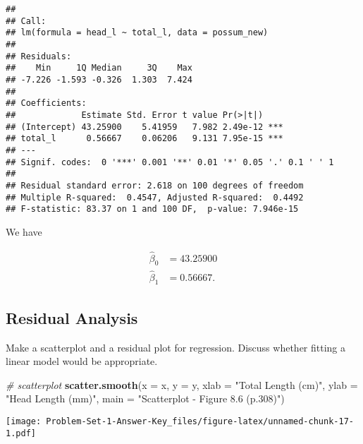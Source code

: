 \documentclass[
]{book}
\newenvironment{Shaded}{\begin{snugshade}}{\end{snugshade}}
\newcommand{\CommentTok}[1]{\textcolor[rgb]{0.56,0.35,0.01}{\textit{#1}}}
\newcommand{\DataTypeTok}[1]{\textcolor[rgb]{0.13,0.29,0.53}{#1}}
\newcommand{\DecValTok}[1]{\textcolor[rgb]{0.00,0.00,0.81}{#1}}
\newcommand{\KeywordTok}[1]{\textcolor[rgb]{0.13,0.29,0.53}{\textbf{#1}}}
\newcommand{\NormalTok}[1]{#1}
\newcommand{\OperatorTok}[1]{\textcolor[rgb]{0.81,0.36,0.00}{\textbf{#1}}}
\newcommand{\StringTok}[1]{\textcolor[rgb]{0.31,0.60,0.02}{#1}}
\begin{document}
\begin{verbatim}
## 
## Call:
## lm(formula = head_l ~ total_l, data = possum_new)
## 
## Residuals:
##    Min     1Q Median     3Q    Max 
## -7.226 -1.593 -0.326  1.303  7.424 
## 
## Coefficients:
##             Estimate Std. Error t value Pr(>|t|)    
## (Intercept) 43.25900    5.41959   7.982 2.49e-12 ***
## total_l      0.56667    0.06206   9.131 7.95e-15 ***
## ---
## Signif. codes:  0 '***' 0.001 '**' 0.01 '*' 0.05 '.' 0.1 ' ' 1
## 
## Residual standard error: 2.618 on 100 degrees of freedom
## Multiple R-squared:  0.4547, Adjusted R-squared:  0.4492 
## F-statistic: 83.37 on 1 and 100 DF,  p-value: 7.946e-15
\end{verbatim}

We have

\begin{align}
\hat{\beta}_0 & = 43.25900 \\
\hat{\beta}_1 & = 0.56667.
\end{align}

\hypertarget{residual-analysis}{%
\subsection{Residual Analysis}\label{residual-analysis}}

Make a scatterplot and a residual plot for regression. Discuss whether fitting a linear model would be appropriate.

\begin{Shaded}
\begin{Highlighting}[]
\CommentTok{# scatterplot}
\KeywordTok{scatter.smooth}\NormalTok{(}\DataTypeTok{x =}\NormalTok{ x, }\DataTypeTok{y =}\NormalTok{ y, }
               \DataTypeTok{xlab =} \StringTok{"Total Length (cm)"}\NormalTok{, }
               \DataTypeTok{ylab =} \StringTok{"Head Length (mm)"}\NormalTok{, }
               \DataTypeTok{main =} \StringTok{"Scatterplot - Figure 8.6 (p.308)"}\NormalTok{) }
\end{Highlighting}
\end{Shaded}

\texttt{[image: Problem-Set-1-Answer-Key\_files/figure-latex/unnamed-chunk-17-1.pdf]}

\begin{Shaded}
\end{Shaded}
\end{document}

